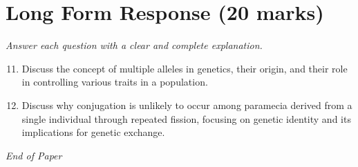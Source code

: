 \documentclass[12pt]{article}
\begin{document}
\section*{Long Form Response (20 marks)}
\textit{Answer each question with a clear and complete explanation.}
\begin{enumerate}[label=\arabic*.]
\setcounter{enumi}{10}
\item Discuss the concept of multiple alleles in genetics, their origin, and their role in controlling various traits in a population.
\item Discuss why conjugation is unlikely to occur among paramecia derived from a single individual through repeated fission, focusing on genetic identity and its implications for genetic exchange.
\end{enumerate}

\vfill
\noindent\textit{End of Paper}
\end{document}
